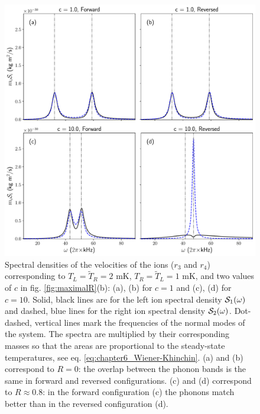 \begin{figure}[t]
  \center
  \includegraphics[width=0.75\linewidth]{Figures/SpectrumComparative.pdf}
  \caption{Spectral densities of the velocities of the ions ($r_3$ and $r_4$) corresponding to $T_L=\tilde{T}_R=2$ mK, $T_R=\tilde{T}_L=1$ mK, and  two values of $c$ in fig. \ref{fig:maximalR}(b): (a), (b) for $c=1$ and (c), (d) for $c=10$. Solid, black lines are for the left ion spectral density ${\cal{S}}_1(\omega)$ and dashed, blue lines for the right ion spectral density
 ${\cal{S}}_2(\omega)$. Dot-dashed, vertical lines mark the frequencies of the normal modes of the system. The spectra are multiplied by their corresponding masses so that  the areas are proportional to the steady-state temperatures, see  eq. \eqref{eq:chapter6_Wiener-Khinchin}. (a) and (b) correspond to $R = 0$:  the overlap between the phonon bands is the same in forward and reversed configurations. (c) and (d) correspond to $R\approx 0.8$:  in the forward configuration (c)  the phonons match better than in the reversed configuration (d).}
  \label{fig:Figure_Spectra}
\end{figure}

